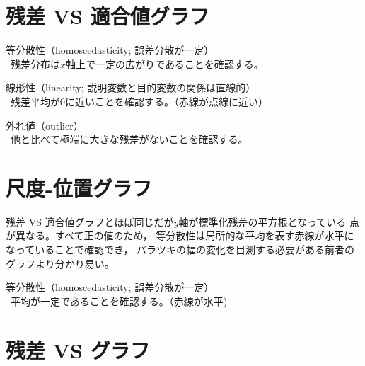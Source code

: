 \section{残差 VS 適合値グラフ}

{
  \MyEnums
  {
    \item 等分散性（homoscedasticity; 誤差分散が一定）\\
      \ra~残差分布は$x$軸上で一定の広がりであることを確認する。
    \item 線形性（linearity; 説明変数と目的変数の関係は直線的）\\
      \ra~残差平均が0に近いことを確認する。（赤線が点線に近い）
    \item 外れ値（outlier）\\
      \ra~他と比べて極端に大きな残差がないことを確認する。
  }
}

\section{尺度-位置グラフ}

{
  残差 VS 適合値グラフとほぼ同じだが$y$軸が標準化残差の平方根となっている
  点が異なる。すべて正の値のため，
  等分散性は局所的な平均を表す赤線が水平になっていることで確認でき，
  バラツキの幅の変化を目測する必要がある前者のグラフより分かり易い。
  \MyEnums
  {
    \item 等分散性（homoscedasticity; 誤差分散が一定）\\
      \ra~平均が一定であることを確認する。（赤線が水平)
  }
}

\section{残差 VS グラフ}

